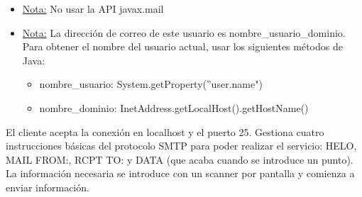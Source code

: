 \documentclass{article}
\begin{document}
\begin{itemize}
\begin{center}
\end{center}
\item \underline{Nota:} No usar la API javax.mail
\item \underline{Nota:} La dirección de correo de este usuario es nombre\_usuario\@nombre\_dominio. Para obtener el nombre del usuario actual, usar los siguientes métodos de Java:
\begin{itemize}
\item nombre\_usuario: System.getProperty(''user.name")
\item nombre\_dominio: InetAddress.getLocalHost().getHostName()
\end{itemize}
\end{itemize}

El cliente acepta la conexión en localhost y el puerto 25. Gestiona cuatro instrucciones básicas del protocolo SMTP para poder realizar el servicio: HELO, MAIL FROM:, RCPT TO: y DATA (que acaba cuando se introduce un punto). La información necesaria se introduce con un scanner por pantalla y comienza a enviar información.
\end{document}

